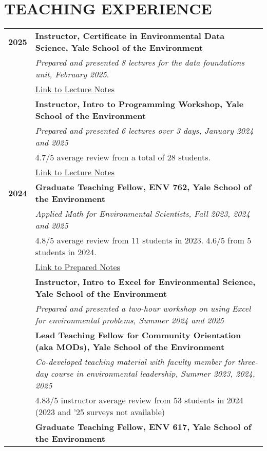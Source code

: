 \documentclass[11pt]{article}
\begin{document}
\section*{TEACHING EXPERIENCE}
\begin{longtable}{>{\bfseries}r p{5.5in}}%
2025 & \textbf{Instructor, Certificate in Environmental Data Science, Yale School of the Environment} \\
    & \textit{Prepared and presented 8 lectures for the data foundations unit, February 2025}.\\ 
    & \href{https://github.com/a5creel/yse_data_science_certificate}{Link to Lecture Notes} \\[1ex]
    & \textbf{Instructor, Intro to Programming Workshop, Yale School of the Environment} \\
    & \textit{Prepared and presented 6 lectures over 3 days, January 2024 and 2025} \\
    & 4.7/5 average review from a total of 28 students.\\
    &  \href{https://github.com/a5creel/intro_to_programming}{Link to Lecture Notes}  \\[1ex]
2024 & \textbf{Graduate Teaching Fellow, ENV 762, Yale School of the Environment} \\
    & \textit{Applied Math for Environmental Scientists, Fall 2023, 2024 and 2025} \\
    & 4.8/5 average review from 11 students in 2023. 4.6/5 from 5 students in 2024. \\
    & \href{https://github.com/a5creel/AMES}{Link to Prepared Notes} \\[1ex]    
    & \textbf{Instructor, Intro to Excel for Environmental Science, Yale School of the Environment} \\
    & \textit{Prepared and presented a two-hour workshop on using Excel for environmental problems, Summer 2024 and 2025} \\[1ex]
    & \textbf{Lead Teaching Fellow for Community Orientation (aka MODs), Yale School of the Environment} \\
    & \textit{Co-developed teaching material with faculty member for three-day course in environmental leadership, Summer 2023, 2024, 2025} \\
    & 4.83/5 instructor average review from 53 students in 2024 (2023 and '25 surveys not available) \\[1ex]
    & \textbf{Graduate Teaching Fellow, ENV 617, Yale School of the Environment} \\

\end{longtable}
\end{document}
